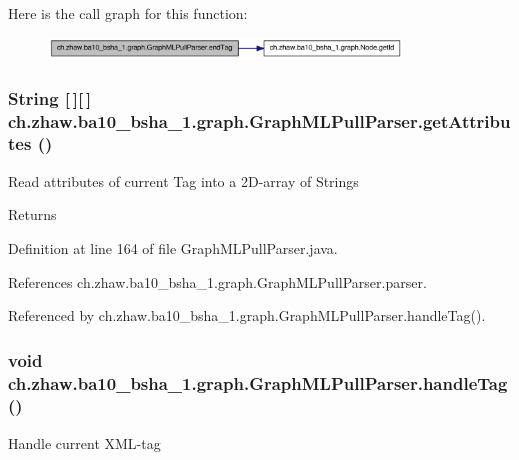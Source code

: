 Here is the call graph for this function:\nopagebreak
\begin{figure}[H]
\begin{center}
\leavevmode
\includegraphics[width=266pt]{classch_1_1zhaw_1_1ba10__bsha__1_1_1graph_1_1GraphMLPullParser_ae57851701120dd3a6c241c4057f88f34_cgraph}
\end{center}
\end{figure}
\hypertarget{classch_1_1zhaw_1_1ba10__bsha__1_1_1graph_1_1GraphMLPullParser_a74f06179a71e0990ec4601c9ce78df29}{
\subsubsection[{getAttributes}]{\setlength{\rightskip}{0pt plus 5cm}String \mbox{[}$\,$\mbox{]}\mbox{[}$\,$\mbox{]} ch.zhaw.ba10\_\-bsha\_\-1.graph.GraphMLPullParser.getAttributes ()}}
\label{classch_1_1zhaw_1_1ba10__bsha__1_1_1graph_1_1GraphMLPullParser_a74f06179a71e0990ec4601c9ce78df29}
Read attributes of current Tag into a 2D-\/array of Strings

\begin{DoxyReturn}{Returns}

\end{DoxyReturn}


Definition at line 164 of file GraphMLPullParser.java.

References ch.zhaw.ba10\_\-bsha\_\-1.graph.GraphMLPullParser.parser.

Referenced by ch.zhaw.ba10\_\-bsha\_\-1.graph.GraphMLPullParser.handleTag().\hypertarget{classch_1_1zhaw_1_1ba10__bsha__1_1_1graph_1_1GraphMLPullParser_aa5ab79571da883a79a97faaed6886f51}{
\subsubsection[{handleTag}]{\setlength{\rightskip}{0pt plus 5cm}void ch.zhaw.ba10\_\-bsha\_\-1.graph.GraphMLPullParser.handleTag ()}}
\label{classch_1_1zhaw_1_1ba10__bsha__1_1_1graph_1_1GraphMLPullParser_aa5ab79571da883a79a97faaed6886f51}
Handle current XML-\/tag 

